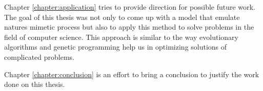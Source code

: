 Chapter \ref{chapter:application} tries to provide direction for possible future work. The goal of this thesis was not only to come up with a model that emulate natures mimetic process but also to apply this method to solve problems in the field of computer science. This approach is similar to the way evolutionary algorithms and genetic programming help us in optimizing solutions of complicated problems. 

Chapter \ref{chapter:conclusion} is an effort to bring a conclusion to justify the work done on this thesis. 